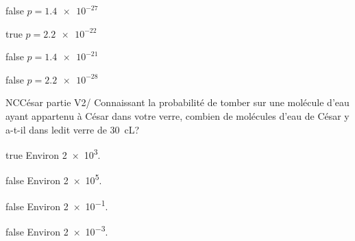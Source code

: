 \documentclass[11pt]{article}
\begin{document}
            \begin{reponses}
            	\item[false] $p = \num{1.4e-27}$
            	\item[true] $p = \num{2.2e-22}$
                \item[false] $p = \num{1.4e-21}$
                \item[false] $p = \num{2.2e-28}$
            \end{reponses}
            
            \begin{question}{NC}{César partie V}{2}{/}
				  Connaissant la probabilité de tomber sur une molécule d'eau ayant appartenu à César dans votre verre, combien de molécules d'eau de César y a-t-il dans ledit verre de \SI{30}{\centi\liter}?  

            \end{question}

            \begin{reponses}
            	\item[true] Environ \num{2e3}.
            	\item[false]   Environ \num{2e5}.
                \item[false]   Environ \num{2e-1}.
                \item[false]   Environ \num{2e-3}.
            \end{reponses}
\end{document}
